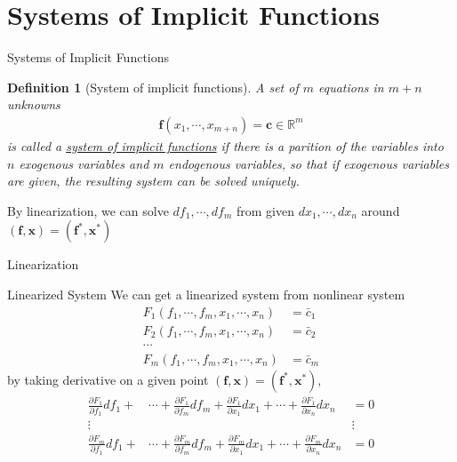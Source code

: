 \documentclass[final]{beamer}
\newtheorem{defn}{Definition}
\newcommand{\bb}{\mathbb}
\newcommand{\bd}{\mathbf}
\newcommand{\p}{\partial}
\begin{document}
\section{Systems of Implicit Functions} %
\label{sec:systems_of_implicit_functions}
\begin{frame}[t]{Systems of Implicit Functions}
	\begin{defn}
		[System of implicit functions] A set of $m$ equations in $m+n$ unknowns
		\begin{align*}
			\bd{f}(x_1,\cdots,x_{m+n}) = \bd c \in \bb{R}^m
		\end{align*}
		is called a \uline{system of implicit functions} if there is a parition of the variables into $n$ exogenous variables and $m$ endogenous variables, so that if exogenous variables are given, the resulting system can be solved uniquely.
	\end{defn}
		By linearization, we can solve $df_1,\cdots,df_m$ from given $dx_1,\cdots,dx_n$ around $(\bd{f},\bd{x})=(\bd{f}^\ast,\bd{x}^\ast)$
\end{frame}
\begin{frame}[t]{Linearization}
	\begin{block}
		{Linearized System}
		We can get a linearized system from nonlinear system
		\begin{align*}
			F_1(f_1,\cdots,f_m, x_1,\cdots,x_n) &= \bar c_1\\
			F_2(f_1,\cdots,f_m, x_1,\cdots,x_n) &= \bar c_2\\
			\cdots\\
			F_m(f_1,\cdots,f_m, x_1,\cdots,x_n) &= \bar c_m
		\end{align*}
		by taking derivative on a given point $(\bd{f},\bd{x})=(\bd{f}^\ast,\bd{x}^\ast)$,
		\begin{align*}
			\frac{\p F_1}{\p f_1}df_1 + 
			&\cdots + \frac{\p F_1}{\p f_m}df_m + \frac{\p F_1}{\p x_1}dx_1 + 
			\cdots + \frac{\p F_1}{\p x_n}dx_n 
			&= 0 \\
			\vdots&
			&\vdots
			\\
			\frac{\p F_m}{\p f_1}df_1 + 
			&\cdots + \frac{\p F_m}{\p f_m}df_m + \frac{\p F_m}{\p x_1}dx_1 + \cdots + \frac{\p F_m}{\p x_n}dx_n 
			&= 0 \\
		\end{align*}
	\end{block}
\end{frame}
\end{document}
